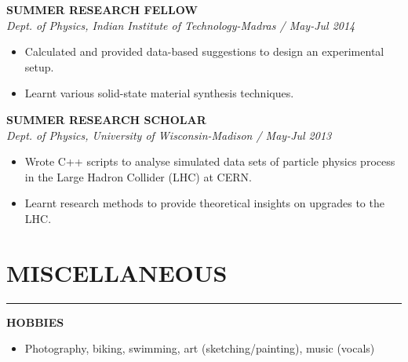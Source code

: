 {\begin{minipage}[t][\textheight-2\fboxsep-2\fboxrule][t]{.6\textwidth}
	\textbf{\uppercase {Summer Research Fellow}} \\
	\textit{Dept. of Physics, Indian Institute of Technology-Madras / {May-Jul 2014}}
	
	\begin{itemize}[noitemsep,topsep=0pt]
		\item Calculated and provided data-based suggestions to design an experimental setup.
		\item Learnt various solid-state material synthesis techniques.
	\end{itemize} \vspace{0.23cm}
	
	
	\textbf{\uppercase {Summer Research Scholar}} \\ 
	\textit{Dept. of Physics, University of Wisconsin-Madison / {May-Jul 2013}} 
	\begin{itemize}[noitemsep,topsep=0pt]
		\item  Wrote C++ scripts to analyse simulated data sets of particle physics process in the Large Hadron Collider (LHC) at CERN.
		\item Learnt research methods to provide theoretical insights on upgrades to the LHC.
	\end{itemize}
	
	\section*{MISCELLANEOUS} \vskip -3.5mm {\color{lightgray}\hrule} \vskip 3.5mm
	\textbf{\uppercase {HOBBIES}}
	
	\begin{itemize}[noitemsep,topsep=0pt]
		\item Photography, biking, swimming, art (sketching/painting), music (vocals)
	\end{itemize}
	
	

	

\end{minipage}}